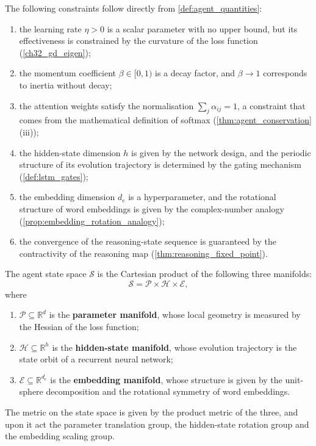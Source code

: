 \begin{property}\label{prop:agent_basic_constraints}
The following constraints follow directly from \cref{def:agent_quantities}:
\begin{enumerate}[label=(\roman*)]
    \item the learning rate $\eta > 0$ is a scalar parameter with no upper bound, but its effectiveness is constrained by the curvature of the loss function (\cref{ch32_gd_eigen});
    \item the momentum coefficient $\beta \in [0,1)$ is a decay factor, and $\beta \to 1$ corresponds to inertia without decay;
    \item the attention weights satisfy the normalisation $\sum_j \alpha_{ij} = 1$, a constraint that comes from the mathematical definition of softmax (\cref{thm:agent_conservation}(iii));
    \item the hidden-state dimension $h$ is given by the network design, and the periodic structure of its evolution trajectory is determined by the gating mechanism (\cref{def:lstm_gates});
    \item the embedding dimension $d_e$ is a hyperparameter, and the rotational structure of word embeddings is given by the complex-number analogy (\cref{prop:embedding_rotation_analogy});
    \item the convergence of the reasoning-state sequence is guaranteed by the contractivity of the reasoning map (\cref{thm:reasoning_fixed_point}).
\end{enumerate}
\end{property}

\begin{definition}\label{def:agent_state_manifold}
The agent state space $\mathcal{S}$ is the Cartesian product of the following three manifolds:
\[
\mathcal{S}=\mathcal{P}\times\mathcal{H}\times\mathcal{E},
\]
where
\begin{enumerate}[label=(\roman*)]
    \item $\mathcal{P}\subseteq\mathbb{R}^d$ is the \textbf{parameter manifold}, whose local geometry is measured by the Hessian of the loss function;
    \item $\mathcal{H}\subseteq\mathbb{R}^h$ is the \textbf{hidden-state manifold}, whose evolution trajectory is the state orbit of a recurrent neural network;
    \item $\mathcal{E}\subseteq\mathbb{R}^{d_e}$ is the \textbf{embedding manifold}, whose structure is given by the unit-sphere decomposition and the rotational symmetry of word embeddings.
\end{enumerate}
The metric on the state space is given by the product metric of the three, and upon it act the parameter translation group, the hidden-state rotation group and the embedding scaling group.
\end{definition}

